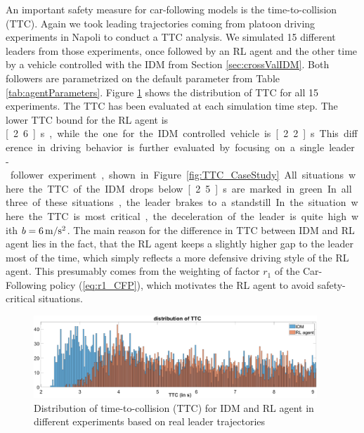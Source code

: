 \documentclass[review]{elsarticle}
\providecommand{\3}{{\ss}}
\begin{document}
An important safety measure for car-following models is the time-to-collision (TTC). Again we took leading trajectories coming from platoon driving experiments in Napoli to conduct a TTC analysis. We simulated 15 different leaders from those experiments, once followed by an RL agent and the other time by a vehicle controlled with the IDM from Section \ref{sec:crossValIDM}. Both followers are parametrized on the default parameter from Table \ref{tab:agentParameters}. Figure \ref{fig:DistributionTTC} shows the distribution of TTC for all 15 experiments. The TTC has been evaluated at each simulation time step. The lower TTC bound for the RL agent is \unit[2.6]{s}, while the one for the IDM controlled vehicle is \unit[2.2]{s}. This difference in driving behavior is further evaluated by focusing on a single leader-follower experiment, shown in Figure \ref{fig:TTC_CaseStudy}. All situations where the TTC of the IDM drops below \unit[2.5]{s} are marked in green. In all three of these situations, the leader brakes to a standstill. In the situation where the TTC is most critical, the deceleration of the leader is quite high with $b = \unit[6]{m/s^2}$. The main reason for the difference in TTC between IDM and RL agent lies in the fact, that the RL agent keeps a slightly higher gap to the leader most of the time, which simply reflects a more defensive driving style of the RL agent. This presumably comes from the weighting of factor $r_1$  of the Car-Following policy (\ref{eq:r1_CFP}), which motivates the RL agent to avoid safety-critical situations. 

\begin{figure}	
	\centering
	\includegraphics[width=0.95\textwidth]{images/DistributionTTC}
	\caption{Distribution of time-to-collision (TTC) for IDM and RL agent in different experiments based on real leader trajectories}
	\label{fig:DistributionTTC}
\end{figure}
\end{document}
